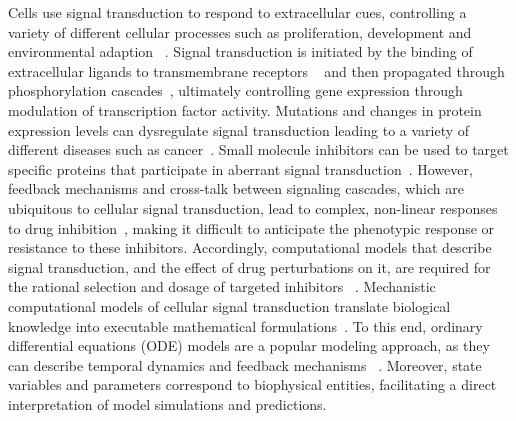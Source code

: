\documentclass[11pt]{article}
\begin{document}
    Cells use signal transduction to respond to extracellular cues,
controlling a variety of different cellular processes such as
proliferation, development and environmental adaption
~\cite{2754712/YK9CS8BY}. Signal transduction is initiated by the binding
of extracellular ligands to transmembrane receptors
~\cite{2754712/QR4JIKLV} and then propagated through phosphorylation
cascades~\cite{2754712/B6ZP8LH6,2754712/NPR437GQ}, ultimately
controlling gene expression through modulation of transcription factor
activity. Mutations and changes in protein expression levels can
dysregulate signal transduction leading to a variety of different
diseases such as cancer~\cite{2754712/L8NRTXRQ}. Small molecule
inhibitors can be used to target specific proteins that participate in
aberrant signal transduction~\cite{2754712/7ZXBI6XG}. However, feedback
mechanisms and cross-talk between signaling cascades, which are
ubiquitous to cellular signal transduction, lead to complex, non-linear
responses to drug inhibition~\cite{2754712/URVR5RD5}, making it
difficult to anticipate the phenotypic response or resistance to these
inhibitors. Accordingly, computational models that describe signal
transduction, and the effect of drug perturbations on it, are required
for the rational selection and dosage of targeted inhibitors
~\cite{2754712/DUK5BLQ4}. Mechanistic computational models of cellular
signal transduction translate biological knowledge into executable
mathematical formulations~\cite{2754712/6JVZVNVK}. To this end, ordinary
differential equations (ODE) models are a popular modeling approach, as
they can describe temporal dynamics and feedback mechanisms
~\cite{2754712/X784IDZJ}. Moreover, state variables and parameters
correspond to biophysical entities, facilitating a direct interpretation
of model simulations and predictions.
\end{document}
